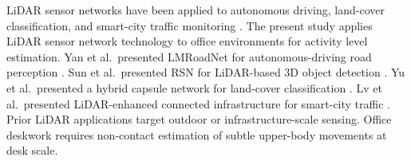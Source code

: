 LiDAR sensor networks have been applied to autonomous driving, land-cover classification, and smart-city traffic monitoring \cite{9090850,Sun_2021_CVPR,8846588,8737958}.
The present study applies LiDAR sensor network technology to office environments for activity level estimation.
Yan et al.\ presented LMRoadNet for autonomous-driving road perception \cite{9090850}.
Sun et al.\ presented RSN for LiDAR-based 3D object detection \cite{Sun_2021_CVPR}.
Yu et al.\ presented a hybrid capsule network for land-cover classification \cite{8846588}.
Lv et al.\ presented LiDAR-enhanced connected infrastructure for smart-city traffic \cite{8737958}.
Prior LiDAR applications target outdoor or infrastructure-scale sensing.
Office deskwork requires non-contact estimation of subtle upper-body movements at desk scale.
